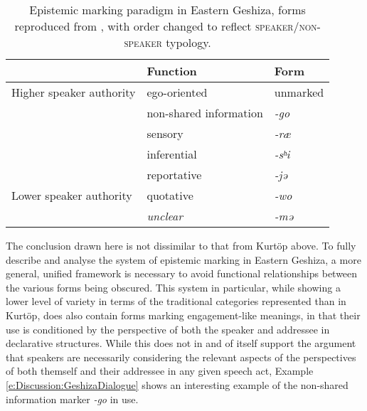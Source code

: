 \begin{table}
    \caption{Epistemic marking paradigm in Eastern Geshiza, forms reproduced from \cite[584]{Honkasalo2019}, with order changed to reflect \textsc{speaker/non-speaker} typology.}\label{t:Discussion:EasternGeshiza}
    \begin{tabular}{|l|l|l|}
        \hline
                                 & Function               & Form          \\ \hline
        Higher speaker authority & ego-oriented           & unmarked      \\
                                 & non-shared information & \textit{-go}  \\
                                 & sensory                & \textit{-ræ}  \\
                                 & inferential            & \textit{-sʰi} \\
                                 & reportative            & \textit{-jə}  \\
        Lower speaker authority  & quotative              & \textit{-wo}  \\ \hline
                                 & \textit{unclear}       & \textit{-mə}  \\ \hline
    \end{tabular}
\end{table}

The conclusion drawn here is not dissimilar to that from Kurtöp above. To fully describe and analyse the system of epistemic marking in Eastern Geshiza, a more general, unified framework is necessary to avoid functional relationships between the various forms being obscured. This system in particular, while showing a lower level of variety in terms of the traditional categories represented than in Kurtöp, does also contain forms marking engagement-like meanings, in that their use is conditioned by the perspective of both the speaker and addressee in declarative structures. While this does not in and of itself support the argument that speakers are necessarily considering the relevant aspects of the perspectives of both themself and their addressee in any given speech act, Example \ref{e:Discussion:GeshizaDialogue} shows an interesting example of the non-shared information marker \textit{-go} in use.

